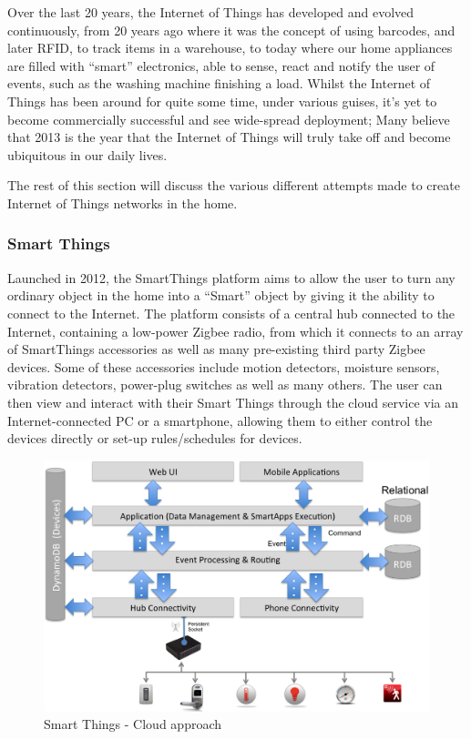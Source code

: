 Over the last 20 years, the Internet of Things has developed and evolved continuously, from 20 years ago where it was the concept of using barcodes, and later RFID\cite{K.Ashton}, to track items in a warehouse, to today where our home appliances are filled with ``smart'' electronics, able to sense, react and notify the user of events, such as the washing machine finishing a load. Whilst the Internet of Things has been around for quite some time, under various guises, it's yet to become commercially successful and see wide-spread deployment; Many believe that 2013 is the year that the Internet of Things will truly take off and become ubiquitous in our daily lives\cite{2013IoT}.

The rest of this section will discuss the various different attempts made to create Internet of Things networks in the home.

\subsubsection{Smart Things} %
\label{ssub:smart_things}
Launched in 2012, the SmartThings platform aims to allow the user to turn any ordinary object in the home into a ``Smart'' object by giving it the ability to connect to the Internet. The platform consists of a central hub connected to the Internet, containing a low-power Zigbee radio, from which it connects to an array of SmartThings accessories as well as many pre-existing third party Zigbee devices. Some of these accessories include motion detectors, moisture sensors, vibration detectors, power-plug switches as well as many others. The user can then view and interact with their Smart Things through the cloud service via an Internet-connected PC or a smartphone, allowing them to either control the devices directly or set-up rules/schedules for devices.

\begin{figure}[h!]
\centering
    \includegraphics[scale=0.4]{images/smartThingsCloudFirstDiagram.png}
    \caption[]{Smart Things - Cloud approach\footnotemark}
    \label{fig:cloud}
\end{figure}

